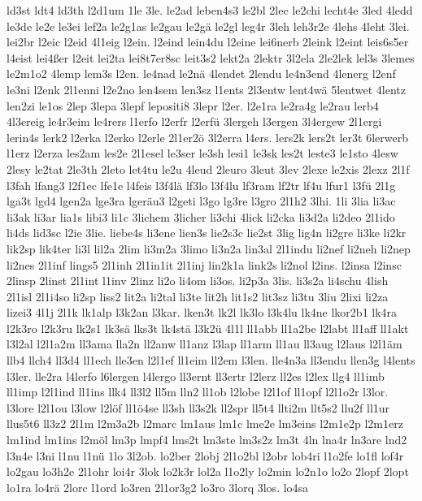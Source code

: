{ld3st
ldt4
ld3th
l2d1um
1le
3le.
le2ad
leben4s3
le2bl
2lec
le2chi
lecht4e
3led
4ledd
le3de
le2e
le3ei
lef2a
le2g1as
le2gau
le2gä
le2gl
leg4r
3leh
leh3r2e
4lehs
4leht
3lei.
lei2br
l2eic
l2eid
4l1eig
l2ein.
l2eind
lein4du
l2eine
lei6nerb
2leink
l2eint
leis6s5er
l4eist
lei4ßer
l2eit
lei2ta
lei8t7er8sc
leit3s2
lekt2a
2lektr
3l2ela
2le2lek
lel3s
3lemes
le2m1o2
4lemp
lem3s
l2en.
le4nad
le2nä
4lendet
2lendu
le4n3end
4lenerg
l2enf
le3ni
l2enk
2l1enni
l2e2no
len4sem
len3sz
l1ents
2l3entw
lent4wä
5lentwet
4lentz
len2zi
le1os
2lep
3lepa
3lepf
lepositi8
3lepr
l2er.
l2e1ra
le2ra4g
le2rau
lerb4
4l3ereig
le4r3eim
le4rers
l1erfo
l2erfr
l2erfü
3lergeh
l3ergen
3l4ergew
2l1ergi
lerin4s
lerk2
l2erka
l2erko
l2erle
2l1er2ö
3l2erra
l4ers.
lers2k
lers2t
ler3t
6lerwerb
l1erz
l2erza
les2am
les2e
2l1esel
le3ser
le3sh
lesi1
le3sk
les2t
leste3
le1sto
4lesw
2lesy
le2tat
2le3th
2leto
let4tu
le2u
4leud
2leuro
3leut
3lev
2lexe
le2xis
2lexz
2l1f
l3fah
lfang3
l2f1ec
lfe1e
l4feis
l3f4lä
lf3lo
l3f4lu
lf3ram
lf2tr
lf4u
lfur1
l3fü
2l1g
lga3t
lgd4
lgen2a
lge3ra
lgeräu3
l2geti
l3go
lg3re
l3gro
2l1h2
3lhi.
1li
3lia
li3ac
li3ak
li3ar
lia1s
libi3
li1c
3lichem
3licher
li3chi
4lick
li2cka
li3d2a
li2deo
2l1ido
li4ds
lid3sc
l2ie
3lie.
liebe4s
li3ene
lien3s
lie2s3c
lie2st
3lig
lig4n
li2gre
li3ke
li2kr
lik2sp
lik4ter
li3l
lil2a
2lim
li3m2a
3limo
li3n2a
lin3al
2l1indu
li2nef
li2neh
li2nep
li2nes
2l1inf
lings5
2l1inh
2l1in1it
2l1inj
lin2k1a
link2s
li2nol
l2ins.
l2insa
l2insc
2linsp
2linst
2l1int
l1inv
2linz
li2o
li4om
li3os.
li2p3a
3lis.
li3s2a
li4schu
4lish
2l1isl
2l1i4so
li2sp
liss2
lit2a
li2tal
li3te
lit2h
lit1s2
lit3sz
li3tu
3liu
2lixi
li2za
lizei3
4l1j
2l1k
lk1alp
l3k2an
l3kar.
lken3t
lk2l
lk3lo
l3k4lu
lk4ne
lkor2b1
lk4ra
l2k3ro
l2k3ru
lk2s1
lk3sä
lks3t
lk4stä
l3k2ü
4l1l
ll1abb
ll1a2be
l2labt
ll1aff
ll1akt
l3l2al
l2l1a2m
ll3ama
lla2n
ll2anw
ll1anz
l3lap
ll1arm
ll1au
ll3aug
l2laus
l2l1äm
llb4
llch4
ll3d4
ll1ech
lle3en
l2l1ef
ll1eim
ll2em
l3len.
lle4n3a
ll3endu
llen3g
l4lents
l3ler.
lle2ra
l4lerfo
l6lergen
l4lergo
ll3ernt
ll3ertr
l2lerz
ll2es
l2lex
llg4
ll1imb
ll1imp
l2l1ind
ll1ins
llk4
ll3l2
ll5m
lln2
ll1ob
l2lobe
l2l1of
ll1opf
l2l1o2r
l3lor.
l3lore
l2l1ou
l3low
l2löf
ll1ö4se
ll3sh
ll3s2k
ll2spr
ll5t4
llti2m
llt5s2
llu2f
ll1ur
llus5t6
ll3z2
2l1m
l2m3a2b
l2marc
lm1aus
lm1c
lme2e
lm3eins
l2m1e2p
l2m1erz
lm1ind
lm1ins
l2möl
lm3p
lmpf4
lms2t
lm3ste
lm3s2z
lm3t
4ln
lna4r
ln3are
lnd2
l3n4e
l3ni
l1nu
l1nü
1lo
3l2ob.
lo2ber
2lobj
2l1o2bl
l2obr
lob4ri
l1o2fe
lo1fl
lof4r
lo2gau
lo3h2e
2l1ohr
loi4r
3lok
lo2k3r
lol2a
l1o2ly
lo2min
lo2n1o
lo2o
2lopf
2lopt
lo1ra
lo4rä
2lorc
l1ord
lo3ren
2l1or3g2
lo3ro
3lorq
3los.
lo4sa
}
